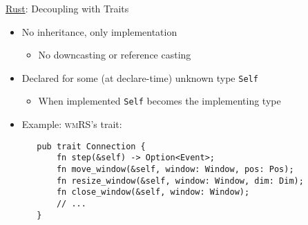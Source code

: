 \begin{frame}[fragile]{\underline{Rust}: Decoupling with Traits \hfill {\footnotesize \currentname}}


    \begin{itemize}

        \item No inheritance, only implementation\\
            \begin{itemize}
                \item No downcasting or reference casting
            \end{itemize}

        \item Declared for some (at declare-time) unknown type \texttt{Self}\\
            \begin{itemize}
                \item When implemented \texttt{Self} becomes the implementing type
            \end{itemize}

        \item Example: \textsc{wmRS}'s  trait:\\
\begin{verbatim}
   pub trait Connection {
       fn step(&self) -> Option<Event>;
       fn move_window(&self, window: Window, pos: Pos);
       fn resize_window(&self, window: Window, dim: Dim);
       fn close_window(&self, window: Window);
       // ...
   }
\end{verbatim}

    \end{itemize}

    \vfill

\end{frame}

